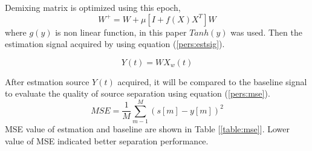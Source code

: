\documentclass[a4paper]{jpconf}
\begin{document}
Demixing matrix is optimized using this epoch,
\begin{equation}
W^+ = W + \mu\left[I + f(X)X^T\right]W
\end{equation}
where $g(y)$ is non linear function, in this paper $Tanh(y)$ was used. Then the estimation signal acquired by using equation (\ref{pers:estsig}).

\begin{equation}\label{pers:estsig}
Y(t) = WX_w(t)
\end{equation}

After estmation source $Y(t)$ acquired, it will be compared to the baseline signal to evaluate the quality of source separation using equation (\ref{pers:mse}).
\begin{equation}\label{pers:mse}
MSE = \frac{1}{M} \sum_{m-1}^M \left(s[m] - y[m]\right)^2
\end{equation}
MSE value of estmation and baseline are shown in Table [\ref{table:mse}]. Lower value of MSE indicated better separation performance.
\end{document}
